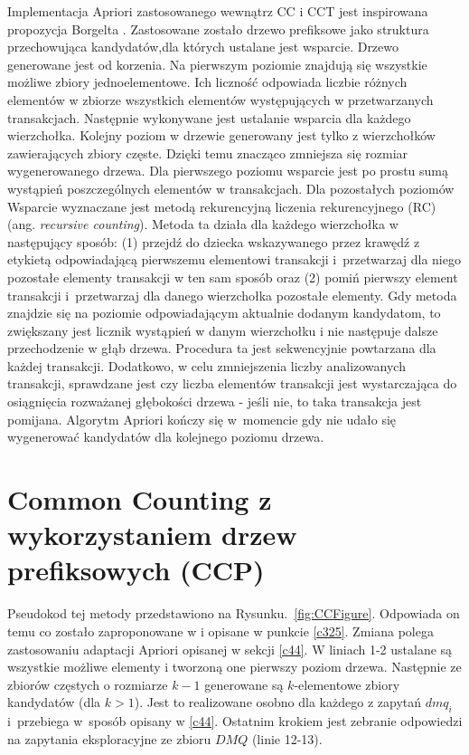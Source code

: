 Implementacja Apriori zastosowanego wewnątrz CC i CCT jest inspirowana propozycja Borgelta \cite{Borgelt}. Zastosowane zostało drzewo prefiksowe jako struktura przechowująca kandydatów,dla których ustalane jest wsparcie. Drzewo generowane jest od korzenia. Na pierwszym poziomie znajdują się wszystkie możliwe zbiory jednoelementowe. Ich liczność odpowiada liczbie różnych elementów w zbiorze wszystkich elementów występujących w przetwarzanych transakcjach. Następnie wykonywane jest ustalanie wsparcia dla każdego wierzchołka. Kolejny poziom w drzewie generowany jest tylko z wierzchołków zawierających zbiory częste. Dzięki temu znacząco zmniejsza się rozmiar wygenerowanego drzewa. Dla pierwszego poziomu wsparcie jest po prostu sumą wystąpień poszczególnych elementów w transakcjach. Dla pozostałych poziomów Wsparcie wyznaczane jest metodą rekurencyjną liczenia rekurencyjnego (RC) (ang. \textit{recursive counting}). Metoda ta działa dla każdego wierzchołka w następujący sposób: (1) przejdź do dziecka wskazywanego przez krawędź z etykietą odpowiadającą pierwszemu elementowi transakcji i~przetwarzaj dla niego pozostałe elementy transakcji w ten sam sposób oraz (2) pomiń pierwszy element transakcji i~przetwarzaj dla danego wierzchołka pozostałe elementy. Gdy metoda znajdzie się na poziomie odpowiadającym aktualnie dodanym kandydatom, to zwiększany jest licznik wystąpień w danym wierzchołku i nie następuje dalsze przechodzenie w głąb drzewa. Procedura ta jest sekwencyjnie powtarzana dla każdej transakcji. Dodatkowo, w celu zmniejszenia liczby analizowanych transakcji, sprawdzane jest czy liczba elementów transakcji jest wystarczająca do osiągnięcia rozważanej głębokości drzewa - jeśli nie, to taka transakcja jest pomijana. Algorytm Apriori kończy się w~momencie gdy nie udało się wygenerować kandydatów dla kolejnego poziomu drzewa.

\section{Common Counting z wykorzystaniem drzew prefiksowych (CCP)}
\label{c45}
Pseudokod tej metody przedstawiono na Rysunku.~\ref{fig:CCFigure}. Odpowiada on temu co zostało zaproponowane w \cite{WojciechowskiCC} i opisane w punkcie \ref{c325}. Zmiana polega zastosowaniu adaptacji Apriori opisanej w sekcji \ref{c44}. W liniach 1-2 ustalane są wszystkie możliwe elementy i tworzoną one pierwszy poziom drzewa. Następnie ze zbiorów częstych o rozmiarze \(k-1\) generowane są \(k\)-elementowe zbiory kandydatów (dla \(k > 1\)). Jest to realizowane osobno dla każdego z zapytań \(dmq_i\) i~przebiega w~sposób opisany w \ref{c44}. Ostatnim krokiem jest zebranie odpowiedzi na zapytania eksploracyjne ze zbioru \(DMQ\) (linie 12-13). 

